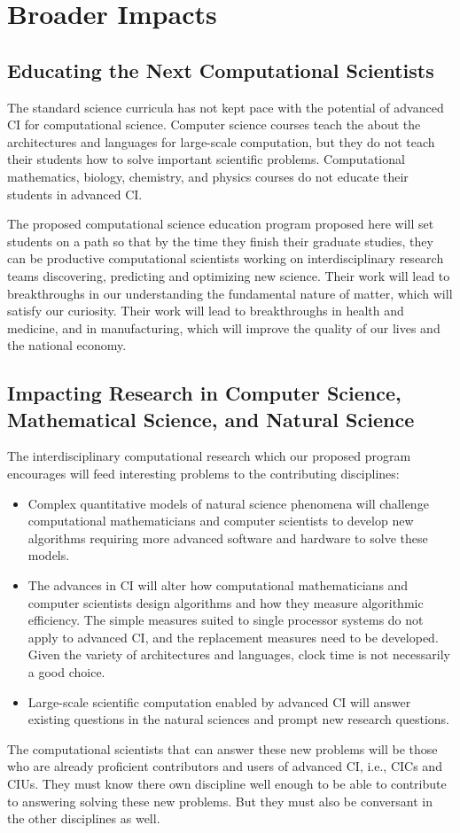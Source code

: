 \documentclass[11pt]{NSFamsart}
\begin{document}
\section{Broader Impacts}

\subsection{Educating the Next Computational Scientists} 
The standard science curricula has not kept pace with the potential of advanced CI for computational science.  Computer science courses teach the about the architectures and languages for large-scale computation, but they do not teach their students how to solve important scientific problems.  Computational mathematics, biology, chemistry, and physics courses do not educate their students in advanced CI.

The proposed computational science education program proposed here will set students on a path so that by the time they finish their graduate studies, they can be productive computational scientists working on interdisciplinary research teams discovering, predicting and optimizing new science.  Their work will lead to breakthroughs in our understanding the fundamental nature of matter, which will satisfy our curiosity.  Their work will lead to breakthroughs in health and medicine, and in manufacturing, which will improve the quality of our lives and the national economy. 

\subsection{Impacting Research in Computer Science, Mathematical Science, and Natural Science}
The interdisciplinary computational research which our proposed program encourages will feed interesting problems to the contributing disciplines:
\begin{itemize}
\item Complex quantitative models of natural science phenomena will challenge computational mathematicians and computer scientists to develop new algorithms requiring more advanced software and hardware to solve these models.  
\item The advances in CI will alter how computational mathematicians and computer scientists design algorithms and how they measure algorithmic efficiency.  The simple measures suited to single processor systems do not apply to advanced CI, and the replacement measures need to be developed.  Given the variety of architectures and languages, clock time is not necessarily a good choice.
\item Large-scale scientific computation enabled by advanced CI will answer existing questions in the natural sciences and prompt new research questions.  
\end{itemize}
The computational scientists that can answer these new problems will be those who are already proficient contributors and users of advanced CI, i.e., CICs and CIUs.  They must know there own discipline well enough to be able to contribute to answering solving these new problems.  But they must also be conversant in the other disciplines as well.
\end{document}
